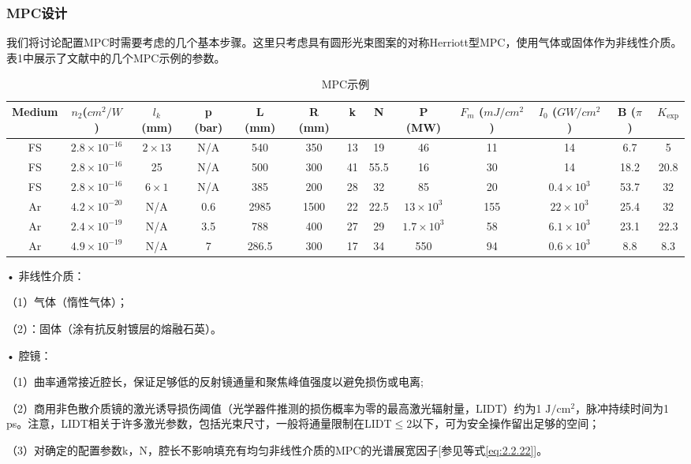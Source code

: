\documentclass[14pt,a4paper,oneside]{article}
\numberwithin{equation}{subsection}             %
\numberwithin{figure}{subsection}               %
\begin{document}
\subsubsection{MPC设计}

我们将讨论配置MPC时需要考虑的几个基本步骤。这里只考虑具有圆形光束图案的对称Herriott型MPC，使用气体或固体作为非线性介质。表1中展示了文献中的几个MPC示例的参数。


\begin{table}[!ht]
    \renewcommand{\arraystretch}{2}
	\centering\fontsize{6pt}{2}\selectfont
    \caption{MPC示例}
    \begin{tabular}{ccccccccccccc}
    \hline
    Medium&$n_2$($cm^2/W$) &$l_k$ (mm) &p (bar) &L (mm) &R (mm) &k &N &P (MW) &$F_m$ ($mJ/cm^2$) &$I_0$ ($GW/cm^2$) &B ($\pi$ ) &$K_{\mathrm{exp}}$\\\hline
    FS &$2.8 \times 10^{-16}$ &$2 \times 13$ &N/A &540 &350 &13 &19 &46 &11 &14 & 6.7 & 5 \\
    FS &$2.8 \times 10^{-16}$ &25 &N/A &500 &300 &41 &55.5 &16 &30 &14 &18.2 &20.8 \\
    FS &$2.8 \times 10^{-16}$ &$6 \times 1$ &N/A &385 &200 &28 &32 &85 &20 &$0.4 \times 10^3$ &53.7 &32 \\
    Ar &$4.2 \times 10^{-20}$ &N/A &0.6 &2985 &1500 &22 &22.5 &$13 \times 10^3$ &155 &$22 \times 10^3$ &25.4 &32 \\
    Ar &$2.4 \times 10^{-19}$ &N/A &3.5 &788 &400 &27 &29 &$1.7 \times 10^3$ &58 &$6.1 \times 10^3$ &23.1 &22.3 \\
    Ar &$4.9 \times 10^{-19}$ &N/A &7 &286.5 &300 &17 &34 &550 &94 &$0.6 \times 10^3$ &8.8 &8.3\\
    \hline
    \end{tabular}
\end{table}

• 非线性介质：

（1）气体（惰性气体）；

（2）：固体（涂有抗反射镀层的熔融石英）。

• 腔镜：

（1）曲率通常接近腔长，保证足够低的反射镜通量和聚焦峰值强度以避免损伤或电离;

（2）商用非色散介质镜的激光诱导损伤阈值（光学器件推测的损伤概率为零的最高激光辐射量，LIDT）约为1 $\mathrm{J/cm^2}$，脉冲持续时间为1 ps。注意，LIDT相关于许多激光参数，包括光束尺寸，一般将通量限制在LIDT$\leq2$以下，可为安全操作留出足够的空间；

（3）对确定的配置参数k，N，腔长不影响填充有均匀非线性介质的MPC的光谱展宽因子[参见等式\ref{eq:2.2.22}]。
\end{document}
